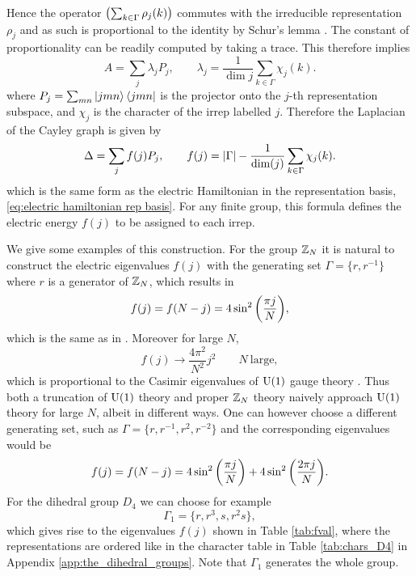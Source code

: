 Hence the operator $\pqty{\sum_{k \in \Gamma} \rho_j(k)}$ commutes with the irreducible representation $\rho_j$ and as such is proportional to the identity by Schur's lemma \cite{serre1967representations}.
The constant of proportionality can be readily computed by taking a trace.
This therefore implies
\begin{equation}
    A = \sum_j \lambda_j P_j, \quad \quad \lambda_j = \frac{1}{\dim{j}} \sum_{k \in \Gamma} \chi_j(k).
\end{equation}
where $P_j = \sum_{mn} \ket{jmn}\bra{jmn}$ is the projector onto the $j$-th representation subspace, and $\chi_j$ is the character of the \ac{irrep} labelled $j$.
Therefore the Laplacian of the Cayley graph is given by
\begin{equation}\label{eq:laplacian finite group}
    \Delta = \sum_j f(j) P_j, \quad \quad f(j)= \abs{\Gamma}-\frac{1}{\mathrm{dim}(j)} \sum_{k \in \Gamma} \chi_j(k).
\end{equation}
which is the same form as the electric Hamiltonian in the representation basis, \eqref{eq:electric hamiltonian rep basis}.
For any finite group, this formula defines the electric energy $f(j)$ to be assigned to each \ac{irrep}.

\medskip

We give some examples of this construction.
For the group $\mathbb{Z}_N$ it is natural to construct the electric eigenvalues $f(j)$ with the generating set $\Gamma = \{r, r^{-1}\}$ where $r$ is a generator of $\mathbb{Z}_N$, which results in
\begin{equation}
    \label{eq:fj ZN}
    f(j)=f(N-j) = 4\sin^2\pqty{\frac{\pi j}{N}},
\end{equation}
which is the same as in \cite{notarnicola2015discrete}.
Moreover for large $N$,
\begin{equation}
    f(j) \to \frac{4\pi^2}{N^2} j^2 \qquad N \mathrm{~large},
\end{equation}
which is proportional to the Casimir eigenvalues of $\mathrm{U}(1)$ gauge theory \cite{notarnicola2015discrete}.
Thus both a truncation of $\mathrm{U}(1)$ theory and proper $\mathbb{Z}_N$ theory naively approach $\mathrm{U}(1)$ theory for large $N$, albeit in different ways.
One can however choose a different generating set, such as $\Gamma = \{r, r^{-1}, r^2, r^{-2}\}$ and the corresponding eigenvalues would be
\begin{equation}
    f(j)=f(N-j) = 4\sin^2\pqty{\frac{\pi j}{N}}+4\sin^2\pqty{\frac{2\pi j}{N}}.
\end{equation}
For the dihedral group $D_4$ we can choose for example
\begin{equation*}
    \Gamma_1 = \{r,r^3,s,r^2s\},
\end{equation*}
which gives rise to the eigenvalues $f(j)$  shown in Table \ref{tab:fval}, where the representations are ordered like in the character table in Table \ref{tab:chars_D4} in Appendix \ref{app:the_dihedral_groups}.
Note that $\Gamma_1$ generates the whole group.

